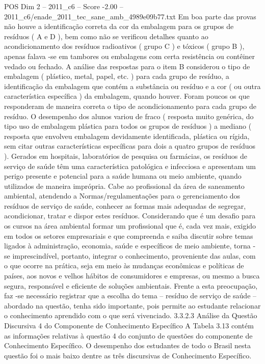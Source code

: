 \begin{textsample}{POS Dim 2 – 2011\_c6 – Score -2.00 – 2011\_c6/enade\_2011\_tec\_sane\_amb\_4989e09b77.txt}
Em boa parte das provas não houve a identificação correta da cor da embalagem para os grupos de resíduos ( A e D ), bem como não se verificou detalhes quanto ao acondicionamento dos resíduos radioativos ( grupo C ) e tóxicos ( grupo B ), apenas falava -se em tambores ou embalagens com certa resistência ou contêiner vedado ou fechado.
A análise das respostas para o item B considerou o tipo de embalagem ( plástico, metal, papel, etc. ) para cada grupo de resíduo, a identificação da embalagem que contém a substância ou resíduo e a cor ( ou outra característica específica ) da embalagem, quando houver.
Foram poucos os que responderam de maneira correta o tipo de acondicionamento para cada grupo de resíduo.
O desempenho dos alunos variou de fraco ( resposta muito genérica, do tipo uso de embalagem plástica para todos os grupos de resíduos ) a mediano ( resposta que envolveu embalagem devidamente identificada, plástica ou rígida, sem citar outras características específicas para dois a quatro grupos de resíduos ).
Gerados em hospitais, laboratórios de pesquisa ou farmácias, os resíduos de serviço de saúde têm uma característica patológica e infecciosa e apresentam um perigo presente e potencial para a saúde humana ou meio ambiente, quando utilizados de maneira imprópria.
Cabe ao profissional da área de saneamento ambiental, atendendo a Normas/regulamentações para o gerenciamento dos resíduos de serviço de saúde, conhecer as formas mais adequadas de segregar, acondicionar, tratar e dispor estes resíduos.
Considerando que é um desafio para os cursos na área ambiental formar um profissional que é, cada vez mais, exigido em todos os setores empresariais e que compreenda e saiba discutir sobre temas ligados à administração, economia, saúde e específicos de meio ambiente, torna -se imprescindível, portanto, integrar o conhecimento, proveniente das aulas, com o que ocorre na prática, seja em meio às mudanças econômicas e políticas de países, aos novos e velhos hábitos de consumidores e empresas, ou mesmo a busca segura, responsável e eficiente de soluções ambientais.
Frente a esta preocupação, faz -se necessário registrar que a escolha do tema – resíduo de serviço de saúde – abordado na questão, tenha sido importante, pois permite ao estudante relacionar o conhecimento aprendido com o que será vivenciado. 3.3.2.3 Análise da Questão Discursiva 4 do Componente de Conhecimento Específico A Tabela 3.13 contém as informações relativas à questão 4 do conjunto de questões do componente de Conhecimento Específico.
O desempenho dos estudantes de todo o Brasil nesta questão foi o mais baixo dentre as três discursivas de Conhecimento Específico.

\end{textsample}
